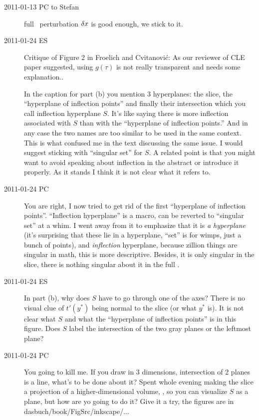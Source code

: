 \begin{description}
\item[2011-01-13 PC to Stefan]
full \statesp\ perturbation $\delta x$ is good enough, we stick to it.

\item[2011-01-24 ES] Critique of Figure 2 in Froelich and Cvitanovi\'c: As our
reviewer of CLE paper suggested, using $g(\tau)$ is not really transparent and
needs some explanation..

In the caption for part (b) you mention 3 hyperplanes:
the slice, the ``hyperplane of inflection points'' and finally their intersection
which you call inflection hyperplane $S$. It's like saying there is more
inflection associated with $S$ than with the
``hyperplane of inflection points.'' And in any case the two names are too
similar to be used in the same context. This is what confused me in the text
discussing the same issue.
I would suggest sticking with ``singular set'' for $S$. A related point is that
you might want to avoid speaking about inflection in the abstract or introduce
it properly. As it stands I think it is not clear what it refers to.

\item[2011-01-24 PC] You are right, I now tried to get rid of the first
``hyperplane of inflection points''. ``Inflection hyperplane'' is a
macro, can be reverted to ``singular set'' at a whim. I went away from it
to emphasize that it is \emph{a hyperplane} (it's surprising that these
lie in a hyperplane, ``set'' is for wimps, just a bunch of points), and
\emph{inflection} hyperplane, because zillion things are singular in
math, this is more descriptive. Besides, it is only singular in the
slice, there is nothing singular about it in the full \statesp.

\item[2011-01-24 ES]
In part (b), why does $S$ have to go through one of the axes? There is no
visual clue of $t'(y^*)$ being normal to the slice (or what $y^*$ is). It
is not clear what $S$ and what the ``hyperplane of inflection points'' is
in this figure. Does $S$ label the intersection of the two gray planes or
the leftmost plane?

\item[2011-01-24 PC] You going to kill me. If you draw in 3 dimensions,
intersection of 2 planes is a line, what's to be done about it? Spent
whole evening making the slice a projection of a higher-dimensional
volume, , so you can visualize $S$  as a plane,
but how are yo going to do it? Give it a try, the figures are in
dasbuch/book/FigSrc/inkscape/...



\end{description}
